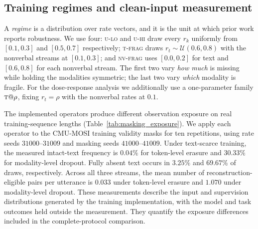 \documentclass[preprint,11pt]{elsarticle}
\begin{document}
\subsection{Training regimes and clean-input measurement}

A \emph{regime} is a distribution over rate vectors, and it is the unit at
which prior work reports robustness. We use four: \textsc{u-lo} and
\textsc{u-hi} draw every $r_k$ uniformly from $[0.1,0.3]$ and $[0.5,0.7]$
respectively; \textsc{t-frag} draws $r_t\sim\mathcal{U}(0.6,0.8)$ with the nonverbal
streams at $[0.1,0.3]$; and \textsc{nv-frag} uses $[0.0,0.2]$ for text and
$[0.6,0.8]$ for each nonverbal stream. The first two vary
\emph{how much} is missing while holding the modalities symmetric; the last
two vary \emph{which} modality is fragile. For the dose-response analysis we
additionally use a one-parameter family $\textsc{t}@\rho$, fixing
$r_t=\rho$ with the nonverbal rates at $0.1$.

The implemented operators produce different observation exposure
on real training-sequence lengths (Table~\ref{tab:masking_exposure}). We apply
each operator to the CMU-MOSI training validity masks for ten repetitions,
using rate seeds $31000$--$31009$ and masking seeds $41000$--$41009$.
Under text-scarce training, the measured intact-text frequency is $0.04\%$
for token-level erasure and $30.33\%$ for modality-level dropout. Fully absent
text occurs in $3.25\%$ and $69.67\%$ of draws, respectively. Across all three
streams, the mean number of reconstruction-eligible pairs per utterance is
$0.033$ under token-level erasure and $1.070$ under modality-level dropout.
These measurements describe the input and supervision distributions generated
by the training implementation, with the model and task outcomes held outside
the measurement. They quantify the exposure differences included in the
complete-protocol comparison.

\begin{table}[t]
\centering
\caption{Measured observation and reconstruction exposure on the 1,284
CMU-MOSI training utterances. Each condition uses ten masking repetitions with
matched nominal rate draws across protocols. Values include the restoration
rule. Rec.\ pairs is the mean number of fully absent sample--modality pairs
per utterance, which determines eligibility for reconstruction supervision.}
\label{tab:masking_exposure}
\small
\resizebox{\linewidth}{!}{}
\end{table}
\end{document}
